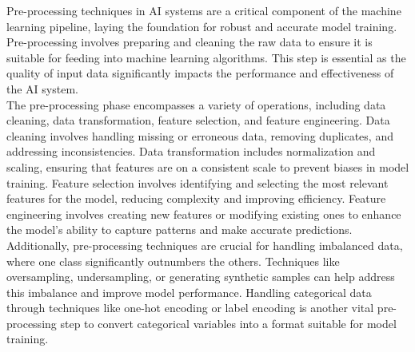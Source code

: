 \documentclass[12pt,a4paper,openright,twoside]{book}
\begin{document}
Pre-processing techniques in AI systems are a critical component of the machine learning pipeline, laying the foundation for robust and accurate model training. Pre-processing involves preparing and cleaning the raw data to ensure it is suitable for feeding into machine learning algorithms. This step is essential as the quality of input data significantly impacts the performance and effectiveness of the AI system. \\
The pre-processing phase encompasses a variety of operations, including data cleaning, data transformation, feature selection, and feature engineering. Data cleaning involves handling missing or erroneous data, removing duplicates, and addressing inconsistencies. Data transformation includes normalization and scaling, ensuring that features are on a consistent scale to prevent biases in model training. Feature selection involves identifying and selecting the most relevant features for the model, reducing complexity and improving efficiency. Feature engineering involves creating new features or modifying existing ones to enhance the model's ability to capture patterns and make accurate predictions. \\
Additionally, pre-processing techniques are crucial for handling imbalanced data, where one class significantly outnumbers the others. Techniques like oversampling, undersampling, or generating synthetic samples can help address this imbalance and improve model performance. Handling categorical data through techniques like one-hot encoding or label encoding is another vital pre-processing step to convert categorical variables into a format suitable for model training.
\end{document}
